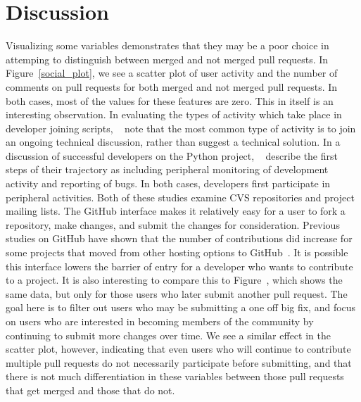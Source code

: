 \documentclass[12pt]{article}
\begin{document}
\section{Discussion}\label{discussion}
Visualizing some variables demonstrates that they may be a poor choice in
attemping to distinguish between merged and not merged pull requests. In
Figure~\ref{social_plot}, we see a scatter plot of user activity and the number
of comments on pull requests for both merged and not merged pull requests. In
both cases, most of the values for these features are zero. This in itself is an
interesting observation. In evaluating the types of activity which take place in
developer joining scripts, ~\cite{von_krogh_community_2003} note that the most
common type of activity is to join an ongoing technical discussion, rather than
suggest a technical solution. In a discussion of successful developers on the
Python project, ~\cite{ducheneaut_socialization_2005} describe the first steps
of their trajectory as including peripheral monitoring of development activity
and reporting of bugs. In both cases, developers first participate in peripheral
activities. Both of these studies examine CVS repositories and project mailing
lists. The GitHub interface makes it relatively easy for a user to fork a
repository, make changes, and submit the changes for consideration. Previous
studies on GitHub have shown that the number of contributions did increase for
some projects that moved from other hosting options to
GitHub~\cite{mcdonald_performance_2013}. It is possible this interface lowers
the barrier of entry for a developer who wants to contribute to a project. It is
also interesting to compare this to Figure~, which
shows the same data, but only for those users who later submit another pull
request. The goal here is to filter out users who may be submitting a one off
big fix, and focus on users who are interested in becoming members of the
community by continuing to submit more changes over time. We see a similar
effect in the scatter plot, however, indicating that even users who will
continue to contribute multiple pull requests do not necessarily participate
before submitting, and that there is not much differentiation in these variables
between those pull requests that get merged and those that do not.
\end{document}
